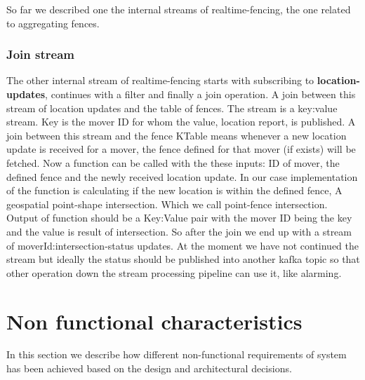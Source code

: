 \documentclass[a4]{report}
\begin{document}
    So far we described one the internal streams of realtime-fencing, the one related to aggregating fences.

    \subsubsection{Join stream}
    The other internal stream of realtime-fencing starts with subscribing to \textbf{location-updates}, continues with a
    filter and finally a join operation.
    A join between this stream of location updates and the table of fences.
    The stream is a key:value stream.
    Key is the mover ID for whom the value, location report, is published.
    A join between this stream and the fence KTable means whenever a new location update is received for a mover,
    the fence defined for that mover (if exists) will be fetched.
    Now a function can be called with the these inputs: ID of mover, the defined fence and the newly received location update.
    In our case implementation of the function is calculating if the new location is within the defined fence, A
    geospatial point-shape intersection.
    Which we call point-fence intersection.
    Output of function should be a Key:Value pair with the mover ID being the key and the value is result of
    intersection.
    So after the join we end up with a stream of moverId:intersection-status updates.
    At the moment we have not continued the stream but ideally the status should be published into another kafka
    topic so that other operation down the stream processing pipeline can use it, like alarming.


    \section{Non functional characteristics}
    In this section we describe how different non-functional requirements of system has been achieved based on the
    design and architectural decisions.
\end{document}
